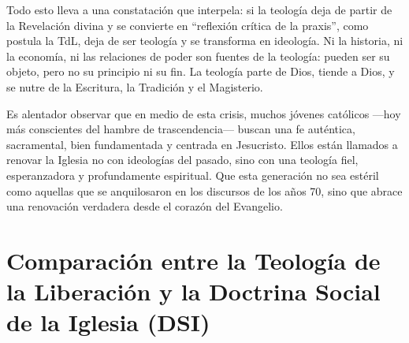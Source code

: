 \documentclass[12pt]{article}
\begin{document}
Todo esto lleva a una constatación que interpela: si la teología deja de partir de la Revelación divina y se convierte en “reflexión crítica de la praxis”, como postula la TdL, deja de ser teología y se transforma en ideología. Ni la historia, ni la economía, ni las relaciones de poder son fuentes de la teología: pueden ser su objeto, pero no su principio ni su fin. La teología parte de Dios, tiende a Dios, y se nutre de la Escritura, la Tradición y el Magisterio.

Es alentador observar que en medio de esta crisis, muchos jóvenes católicos —hoy más conscientes del hambre de trascendencia— buscan una fe auténtica, sacramental, bien fundamentada y centrada en Jesucristo. Ellos están llamados a renovar la Iglesia no con ideologías del pasado, sino con una teología fiel, esperanzadora y profundamente espiritual. Que esta generación no sea estéril como aquellas que se anquilosaron en los discursos de los años 70, sino que abrace una renovación verdadera desde el corazón del Evangelio.

\section*{Comparación entre la Teología de la Liberación y la Doctrina Social de la Iglesia (DSI)}
\end{document}
